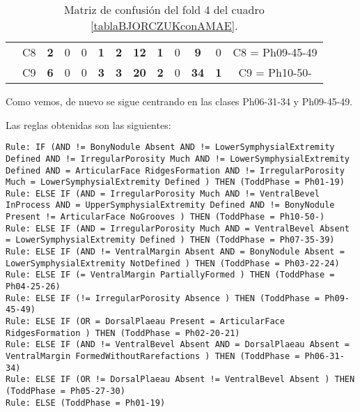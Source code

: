 \begin{table}[H]
{\begin{tabular}{|ccrrrrrrrrrrc|}
\multicolumn{1}{|c|}{}                                      & \multicolumn{1}{c|}{C8} & \multicolumn{1}{c|}{\textbf{2}} & \multicolumn{1}{c|}{0}          & \multicolumn{1}{c|}{0}          & \multicolumn{1}{c|}{\textbf{1}} & \multicolumn{1}{c|}{\textbf{2}} & \multicolumn{1}{c|}{\textbf{12}} & \multicolumn{1}{c|}{\textbf{1}} & \multicolumn{1}{c|}{0}  & \multicolumn{1}{c|}{\textbf{9}}  & \multicolumn{1}{c|}{0}          & C8 = Ph09-45-49   \\ \cline{2-13}
\multicolumn{1}{|c|}{}                                      & \multicolumn{1}{c|}{C9} & \multicolumn{1}{c|}{\textbf{6}} & \multicolumn{1}{c|}{0}          & \multicolumn{1}{c|}{0}          & \multicolumn{1}{c|}{\textbf{3}} & \multicolumn{1}{c|}{\textbf{3}} & \multicolumn{1}{c|}{\textbf{20}} & \multicolumn{1}{c|}{\textbf{2}} & \multicolumn{1}{c|}{0}  & \multicolumn{1}{c|}{\textbf{34}} & \multicolumn{1}{c|}{\textbf{1}} & C9 = Ph10-50-     \\ \hline
\end{tabular}%
}
\caption{Matriz de confusión del fold 4 del cuadro \ref{tablaBJORCZUKconAMAE}.}
\end{table}


Como vemos, de nuevo se sigue centrando en las clases Ph06-31-34 y Ph09-45-49.

\newpage

Las reglas obtenidas son las siguientes:

\begin{lstlisting}
Rule: IF (AND != BonyNodule Absent AND != LowerSymphysialExtremity Defined AND != IrregularPorosity Much AND != LowerSymphysialExtremity Defined AND = ArticularFace RidgesFormation AND != IrregularPorosity Much = LowerSymphysialExtremity Defined ) THEN (ToddPhase = Ph01-19)
Rule: ELSE IF (AND = IrregularPorosity Much AND != VentralBevel InProcess AND = UpperSymphysialExtremity Defined AND != BonyNodule Present != ArticularFace NoGrooves ) THEN (ToddPhase = Ph10-50-)
Rule: ELSE IF (AND = IrregularPorosity Much AND = VentralBevel Absent = LowerSymphysialExtremity Defined ) THEN (ToddPhase = Ph07-35-39)
Rule: ELSE IF (AND != VentralMargin Absent AND = BonyNodule Absent = LowerSymphysialExtremity NotDefined ) THEN (ToddPhase = Ph03-22-24)
Rule: ELSE IF (= VentralMargin PartiallyFormed ) THEN (ToddPhase = Ph04-25-26)
Rule: ELSE IF (!= IrregularPorosity Absence ) THEN (ToddPhase = Ph09-45-49)
Rule: ELSE IF (OR = DorsalPlaeau Present = ArticularFace RidgesFormation ) THEN (ToddPhase = Ph02-20-21)
Rule: ELSE IF (AND != VentralBevel Absent AND = DorsalPlaeau Absent = VentralMargin FormedWithoutRarefactions ) THEN (ToddPhase = Ph06-31-34)
Rule: ELSE IF (OR != DorsalPlaeau Absent != VentralBevel Absent ) THEN (ToddPhase = Ph05-27-30)
Rule: ELSE (ToddPhase = Ph01-19)
\end{lstlisting}


